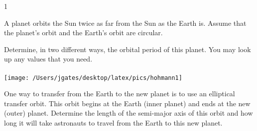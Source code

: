 
\AddToShipoutPicture*{\BackgroundPic}

\addtocounter {ProbNum} {1}

 
{\bf \Large{}} A planet orbits the Sun twice as far from the Sun as the Earth is.  Assume that the planet's orbit and the Earth's orbit are circular.

\bigskip
Determine, in two different ways, the orbital period of this planet. You may look up any values that you need.\paragraph{}
\noindent
\vfill

\begin{floatingfigure}[r]{.26\textwidth}
\texttt{[image: /Users/jgates/desktop/latex/pics/hohmann1]}
\end{floatingfigure}

One way to transfer from the Earth to the new planet is to use an elliptical transfer orbit. This orbit begins at the Earth (inner planet) and ends at the new (outer) planet.  Determine the length of the semi-major axis of this orbit and how long it will take astronauts to travel from the Earth to this new planet.
\vfill
\newpage